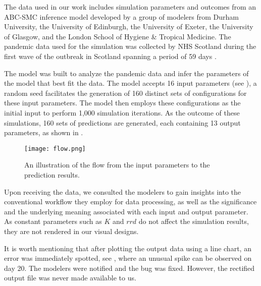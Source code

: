 The data used in our work includes simulation parameters and outcomes from an \ac{ABC-SMC} inference model \cite{toni2008Approximate} developed by a group of modelers from Durham University, the University of Edinburgh, the University of Exeter, the University of Glasgow, and the London School of Hygiene \& Tropical Medicine.
The pandemic data used for the simulation was collected by NHS Scotland during the first wave of the outbreak in Scotland spanning a period of 59 days \cite{2020Covid19}.

\begin{samepage}
The model was built to analyze the pandemic data and infer the parameters of the model that best fit the data.
The model accepts 16 input parameters (see ), a random seed facilitates the generation of 160 distinct sets of configurations for these input parameters.
The model then employs these configurations as the initial input to perform 1,000 simulation iterations. As the outcome of these simulations, 160 sets of predictions are generated, each containing 13 output parameters, as shown in .

\begin{figure}[tb!]
    \centering
    \texttt{[image: flow.png]}
    \caption{An illustration of the flow from the input parameters to the prediction results.
    }
    \label{fig:flow}
\end{figure}

\end{samepage}



Upon receiving the data, we consulted the modelers to gain insights into the conventional workflow they employ for data processing, as well as the significance and the underlying meaning associated with each input and output parameter. As constant parameters such as $K$ and $rrd$ do not affect the simulation results, they are not rendered in our visual designs.

It is worth mentioning that after plotting the output data using a line chart, an error was immediately spotted, see , where an unusual spike can be observed on day 20.
The modelers were notified and the bug was fixed.
However, the rectified output file was never made available to us.
